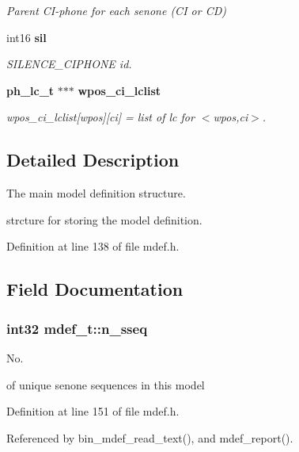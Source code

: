 \begin{DoxyCompactItemize}
\begin{DoxyCompactList}\small\item\em Parent C\-I-\/phone for each senone (C\-I or C\-D) \end{DoxyCompactList}\item 
int16 {\bf sil}\label{structmdef__t_acc9a57b57bbecaef55cc72be57b875f6}

\begin{DoxyCompactList}\small\item\em S\-I\-L\-E\-N\-C\-E\-\_\-\-C\-I\-P\-H\-O\-N\-E id. \end{DoxyCompactList}\item 
{\bf ph\-\_\-lc\-\_\-t} $\ast$$\ast$$\ast$ {\bf wpos\-\_\-ci\-\_\-lclist}
\begin{DoxyCompactList}\small\item\em wpos\-\_\-ci\-\_\-lclist[wpos][ci] = list of lc for $<$wpos,ci$>$. \end{DoxyCompactList}\end{DoxyCompactItemize}


\subsection{Detailed Description}
The main model definition structure. 

strcture for storing the model definition. 

Definition at line 138 of file mdef.\-h.



\subsection{Field Documentation}
\subsubsection[{n\-\_\-sseq}]{\setlength{\rightskip}{0pt plus 5cm}int32 mdef\-\_\-t\-::n\-\_\-sseq}\label{structmdef__t_ad9afd537734fe1f336e20218da28fb2c}


No. 

of unique senone sequences in this model 

Definition at line 151 of file mdef.\-h.



Referenced by bin\-\_\-mdef\-\_\-read\-\_\-text(), and mdef\-\_\-report().

